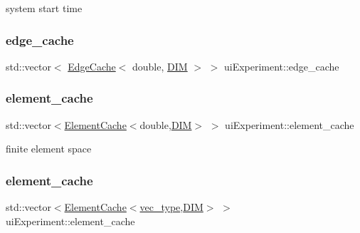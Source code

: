 system start time 

\mbox{\label{classui_experiment_a8c9962fa5c8eefe78f7d0612e0fd7dd2}} 
\subsubsection{\texorpdfstring{edge\+\_\+cache}{edge\_cache}}
{\footnotesize\ttfamily std\+::vector$<$ \mbox{\hyperlink{struct_edge_cache}{Edge\+Cache}}$<$ double, \mbox{\hyperlink{complex__node___t_h_f_e_m_2uiexp_8h_a589b8b9bfdf714f736059845d568b597}{D\+IM}} $>$ $>$ ui\+Experiment\+::edge\+\_\+cache\hspace{0.3cm}{\ttfamily [private]}}

\mbox{\label{classui_experiment_a3386a72dec8a1d7065f553f42d1f181b}} 
\subsubsection{\texorpdfstring{element\+\_\+cache}{element\_cache}\hspace{0.1cm}{\footnotesize\ttfamily [1/2]}}
{\footnotesize\ttfamily std\+::vector$<$\mbox{\hyperlink{struct_element_cache}{Element\+Cache}}$<$double,\mbox{\hyperlink{complex__node___t_h_f_e_m_2uiexp_8h_a589b8b9bfdf714f736059845d568b597}{D\+IM}}$>$ $>$ ui\+Experiment\+::element\+\_\+cache\hspace{0.3cm}{\ttfamily [private]}}



finite element space 

\mbox{\label{classui_experiment_a86da24faea838d0a39a7b89d2f09c81c}} 
\subsubsection{\texorpdfstring{element\+\_\+cache}{element\_cache}\hspace{0.1cm}{\footnotesize\ttfamily [2/2]}}
{\footnotesize\ttfamily std\+::vector$<$\mbox{\hyperlink{struct_element_cache}{Element\+Cache}}$<$\mbox{\hyperlink{complex__edge___t_h_f_e_m_2emdefs_8h_a0a0de407de54661e0d56aa8686c104d9}{vec\+\_\+type}},\mbox{\hyperlink{complex__node___t_h_f_e_m_2uiexp_8h_a589b8b9bfdf714f736059845d568b597}{D\+IM}}$>$ $>$ ui\+Experiment\+::element\+\_\+cache\hspace{0.3cm}{\ttfamily [private]}}



